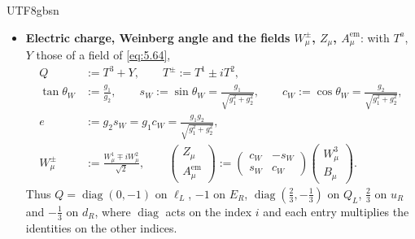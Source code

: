 \documentclass[11pt,a4paper,oneside]{report}
\begin{document}
\begin{CJK*}{UTF8}{gbsn}
\begin{itemize}
\item \textbf{\boldmath Electric charge, Weinberg angle and the fields $W_\mu^\pm$, $Z_\mu$, $A_\mu^{\mathrm{em}}$}: with $T^a$, $Y$ those of a field of \eqref{eq:5.64},
\begin{equation*}
\begin{aligned}
Q&:=T^3+Y,\qquad T^\pm:=T^1\pm iT^2,\\
\tan\theta_W&:=\frac{g_1}{g_2},\qquad s_W:=\sin\theta_W=\frac{g_1}{\sqrt{g_1^2+g_2^2}},\qquad c_W:=\cos\theta_W=\frac{g_2}{\sqrt{g_1^2+g_2^2}},\\
e&:=g_2s_W=g_1c_W=\frac{g_1g_2}{\sqrt{g_1^2+g_2^2}},\\
W_\mu^\pm&:=\frac{W_\mu^1\mp iW_\mu^2}{\sqrt2},\qquad
\begin{pmatrix}Z_\mu\\A_\mu^{\mathrm{em}}\end{pmatrix}:=\begin{pmatrix}c_W&-s_W\\s_W&c_W\end{pmatrix}\begin{pmatrix}W_\mu^3\\B_\mu\end{pmatrix}.
\end{aligned}
\tag{5.65}\label{eq:5.65}
\end{equation*}
Thus $Q=\operatorname{diag}(0,-1)$ on $\ell_L$, $-1$ on $E_R$, $\operatorname{diag}(\frac23,-\frac13)$ on $Q_L$, $\frac23$ on $u_R$ and $-\frac13$ on $d_R$, where $\operatorname{diag}$ acts on the index $i$ and each entry multiplies the identities on the other indices.
\end{itemize}



\end{CJK*}
\end{document}
